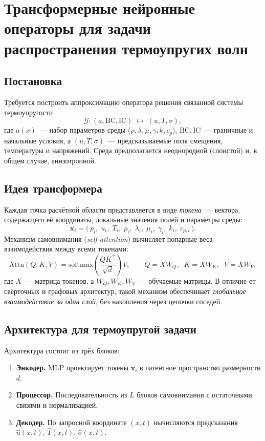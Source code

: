\documentclass[12pt]{article}
\begin{document}
\section*{Трансформерные нейронные операторы для задачи распространения термоупругих волн}

\subsection*{Постановка}

Требуется построить аппроксимацию оператора решения связанной системы термоупругости
\[
\mathcal{G} : (a, \mathrm{BC}, \mathrm{IC}) \;\longmapsto\; (u, T, \sigma),
\]
где $a(x)$~--- набор параметров среды ($\rho, \lambda, \mu, \gamma, k, c_p$),
$\mathrm{BC}, \mathrm{IC}$~--- граничные и начальные условия,
а $(u, T, \sigma)$~--- предсказываемые поля смещения, температуры и напряжений.
Среда предполагается неоднородной (слоистой) и, в общем случае, анизотропной.

\subsection*{Идея трансформера}

Каждая точка расчётной области представляется в виде \emph{токена}~--- вектора, содержащего её координаты, локальные значения полей и параметры среды:
\[
\mathbf{x}_i = \bigl(\,p_i,\; u_i,\; T_i,\; \rho_i,\; \lambda_i,\; \mu_i,\; \gamma_i,\; k_i,\; c_{p,i}\,\bigr).
\]
Механизм самовнимания (\emph{self-attention}) вычисляет попарные веса взаимодействия между всеми токенами:
\[
\mathrm{Attn}(Q,K,V)
=
\mathrm{softmax}\!\left(\frac{QK^{\top}}{\sqrt{d}}\right) V,
\qquad
Q = X W_Q,\;\; K = X W_K,\;\; V = X W_V,
\]
где $X$~--- матрица токенов, а $W_Q, W_K, W_V$~--- обучаемые матрицы.
В отличие от свёрточных и графовых архитектур, такой механизм обеспечивает \emph{глобальное взаимодействие за один слой}, без накопления через цепочки соседей.

\subsection*{Архитектура для термоупругой задачи}

Архитектура состоит из трёх блоков:
\begin{enumerate}
\item \textbf{Энкодер.} MLP проектирует токены $\mathbf{x}_i$ в латентное пространство размерности $d$.
\item \textbf{Процессор.} Последовательность из $L$ блоков самовнимания с остаточными связями и нормализацией.
\item \textbf{Декодер.} По запросной координате $(x,t)$ вычисляются предсказания
$\hat{u}(x,t)$, $\hat{T}(x,t)$, $\hat{\sigma}(x,t)$.
\end{enumerate}
\end{document}
